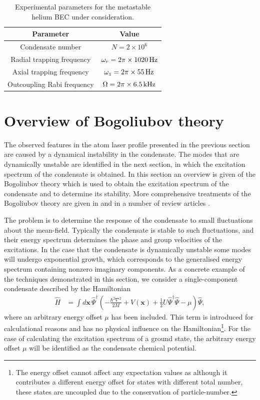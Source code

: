 \begin{table}
    \centering
    \begin{tabular}{cc}
    \toprule
    Parameter & Value\\
    \midrule
    Condensate number & $N = 2\times 10^6$\\
    Radial trapping frequency & $\omega_r = 2 \pi \times \unit[1020]{Hz}$\\
    Axial trapping frequency & $\omega_z = 2\pi \times \unit[55]{Hz}$\\
    Outcoupling Rabi frequency & $\Omega = 2\pi \times \unit[6.5]{kHz}$\\
    \bottomrule
    \end{tabular}
    \caption{Experimental parameters for the metastable helium BEC under consideration.}
    \label{Peaks:ExperimentalParameters}
\end{table}

\section{Overview of Bogoliubov theory}
\label{Peaks:ElementaryExcitations}

The observed features in the atom laser profile presented in the previous section are caused by a dynamical instability in the condensate. The modes that are dynamically unstable are identified in the next section, in which the excitation spectrum of the condensate is obtained. In this section an overview is given of the Bogoliubov theory which is used to obtain the excitation spectrum of the condensate and to determine its stability. More comprehensive treatments of the Bogoliubov theory are given in \citep{PethickSmith} and in a number of review articles \citep{Leggett:2001,Ozeri:2005,Proukakis:2008}.

The problem is to determine the response of the condensate to small fluctuations about the mean-field. Typically the condensate is stable to such fluctuations, and their energy spectrum determines the phase and group velocities of the excitations.  In the case that the condensate is dynamically unstable some modes will undergo exponential growth, which corresponds to the generalised energy spectrum containing nonzero imaginary components. As a concrete example of the techniques demonstrated in this section, we consider a single-component condensate described by the Hamiltonian
\begin{align}
    \label{Peaks:ElementaryExcitationsExampleHamiltonian}
    \hat{H} &= \int d \bm{x}\, \hat{\Psi}^\dagger \left( -\frac{\hbar^2 \nabla^2}{2 M} + V(\bm{x}) + \frac{1}{2} U \hat{\Psi}^\dagger \hat{\Psi} - \mu \right) \hat{\Psi},
\end{align}
where an arbitrary energy offset $\mu$ has been included. This term is introduced for calculational reasons and has no physical influence on the Hamiltonian\footnote{The energy offset cannot affect any expectation values as although it contributes a different energy offset for states with different total number, these states are uncoupled due to the conservation of particle-number.}. For the case of calculating the excitation spectrum of a ground state, the arbitrary energy offset $\mu$ will be identified as the condensate chemical potential.

